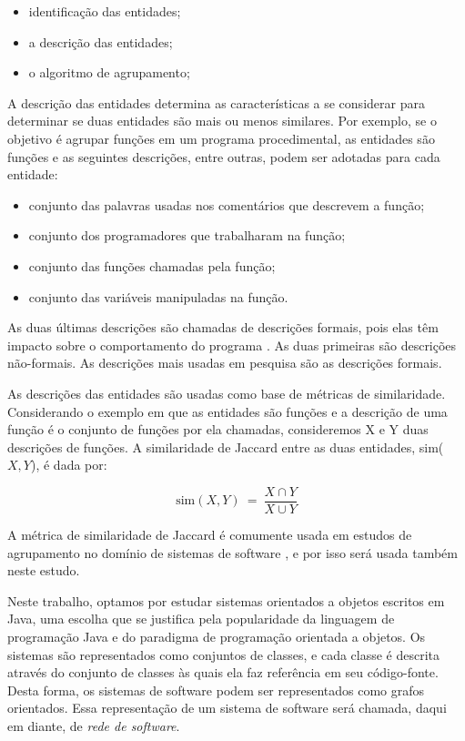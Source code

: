 \begin{itemize}
	\item identificação das entidades;
	\item a descrição das entidades;
	\item o algoritmo de agrupamento;
\end{itemize}

A descrição das entidades determina as características a se considerar para determinar se duas entidades são mais ou menos similares. Por exemplo, se o objetivo é agrupar funções em um programa procedimental, as entidades são funções e as seguintes descrições, entre outras, podem ser adotadas para cada entidade:

\begin{itemize}
	\item conjunto das palavras usadas nos comentários que descrevem a função;
	\item conjunto dos programadores que trabalharam na função;
	\item conjunto das funções chamadas pela função;
	\item conjunto das variáveis manipuladas na função.
\end{itemize}

As duas últimas descrições são chamadas de descrições formais, pois elas têm impacto sobre o comportamento do programa \cite{Anquetil1999}. As duas primeiras são descrições não-formais. As descrições mais usadas em pesquisa são as descrições formais.

As descrições das entidades são usadas como base de métricas de similaridade. Considerando o exemplo em que as entidades são funções e a descrição de uma função é o conjunto de funções por ela chamadas, consideremos X e Y duas descrições de funções. A similaridade de Jaccard entre as duas entidades, sim($X, Y$), é dada por:

$$
\mathrm{sim}(X, Y) ~=~ \frac{X \cap Y}{X \cup Y}
$$

A métrica de similaridade de Jaccard é comumente usada em estudos de agrupamento no domínio de sistemas de software \cite{Anquetil1999,Wu2005}, e por isso será usada também neste estudo.

Neste trabalho, optamos por estudar sistemas orientados a objetos escritos em Java, uma escolha que se justifica pela popularidade da linguagem de programação Java e do paradigma de programação orientada a objetos. Os sistemas são representados como conjuntos de classes, e cada classe é descrita através do conjunto de classes às quais ela faz referência em seu código-fonte. Desta forma, os sistemas de software podem ser representados como grafos orientados. Essa representação de um sistema de software será chamada, daqui em diante, de \emph{rede de software}.

